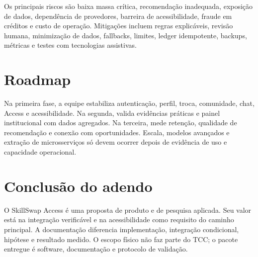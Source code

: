 Os principais riscos são baixa massa crítica, recomendação inadequada, exposição de dados, dependência de provedores, barreira de acessibilidade, fraude em créditos e custo de operação. Mitigações incluem regras explicáveis, revisão humana, minimização de dados, fallbacks, limites, ledger idempotente, backups, métricas e testes com tecnologias assistivas.

\section{Roadmap}

Na primeira fase, a equipe estabiliza autenticação, perfil, troca, comunidade, chat, Access e acessibilidade. Na segunda, valida evidências práticas e painel institucional com dados agregados. Na terceira, mede retenção, qualidade de recomendação e conexão com oportunidades. Escala, modelos avançados e extração de microsserviços só devem ocorrer depois de evidência de uso e capacidade operacional.

\section{Conclusão do adendo}

O SkillSwap Access é uma proposta de produto e de pesquisa aplicada. Seu valor está na integração verificável e na acessibilidade como requisito do caminho principal. A documentação diferencia implementação, integração condicional, hipótese e resultado medido. O escopo físico não faz parte do TCC; o pacote entregue é software, documentação e protocolo de validação.

